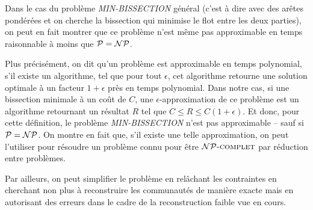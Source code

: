\documentclass[fleqn,11pt, french]{article}
\begin{document}
	Dans le cas du problème \textit{MIN-BISSECTION} général (c'est à dire avec des arêtes pondérées et on cherche la bissection qui minimise le flot entre les deux parties), on peut en fait montrer que ce problème n'est même pas approximable en temps raisonnable à moins que $\mathcal{P} = \mathcal{NP}$\cite{noapprox}.
	
	Plus précisément, on dit qu'un problème est approximable en temps polynomial, s'il existe un algorithme, tel que pour tout $\epsilon$, cet algorithme retourne une solution optimale à un facteur $1+\epsilon$ près en temps polynomial. Dans notre cas, si une bissection minimale à un coût de $C$, une $\epsilon$-approximation de ce problème est un algorithme retournant un résultat $R$ tel que $C \leq R \leq C(1+\epsilon)$. Et donc, pour cette définition, le problème \textit{MIN-BISSECTION} n'est pas approximable -- sauf si $\mathcal{P} = \mathcal{NP}$. On montre en fait que, s'il existe une telle approximation, on peut l'utiliser pour résoudre un problème connu pour être $\mathcal{NP}\text{\textsc{-complet}}$ par réduction entre problèmes.
	
	Par ailleurs, on peut simplifier le problème en relâchant les contraintes en cherchant non plus à reconstruire les communautés de manière exacte mais en autorisant des erreurs dans le cadre de la reconstruction faible vue en cours.
	
	\newpage
	
	
	
	
\end{document}

